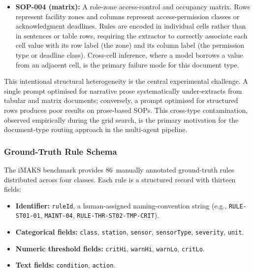 ﻿\documentclass[11pt]{article}
\begin{document}
\begin{itemize}
    \item \textbf{SOP-004 (matrix):}
          A role-zone access-control and occupancy matrix.
          Rows represent facility zones and columns represent access-permission
          classes or acknowledgment deadlines.
          Rules are encoded in individual cells rather than in sentences or table
          rows, requiring the extractor to correctly associate each cell value
          with its row label (the zone) and its column label (the permission type
          or deadline class).
          Cross-cell inference, where a model borrows a value from an adjacent cell,
          is the primary failure mode for this document type.
\end{itemize}

This intentional structural heterogeneity is the central experimental challenge.
A single prompt optimised for narrative prose systematically under-extracts from
tabular and matrix documents; conversely, a prompt optimised for structured rows
produces poor results on prose-based SOPs.
This cross-type contamination, observed empirically during the grid search, is
the primary motivation for the document-type routing approach in the multi-agent
pipeline.

\subsubsection{Ground-Truth Rule Schema}
\label{sec:gt_schema}
The iMAKS benchmark provides 86~manually annotated ground-truth rules distributed
across four classes.
Each rule is a structured record with thirteen fields:

\begin{itemize}
    \item \textbf{Identifier:} \texttt{ruleId}, a human-assigned
          naming-convention string (e.g., \texttt{RULE-ST01-01},
          \texttt{MAINT-04}, \texttt{RULE-THR-ST02-TMP-CRIT}).
    \item \textbf{Categorical fields:} \texttt{class}, \texttt{station},
          \texttt{sensor}, \texttt{sensorType}, \texttt{severity}, \texttt{unit}.
    \item \textbf{Numeric threshold fields:} \texttt{critHi}, \texttt{warnHi},
          \texttt{warnLo}, \texttt{critLo}.
    \item \textbf{Text fields:} \texttt{condition}, \texttt{action}.
\end{itemize}
\end{document}
